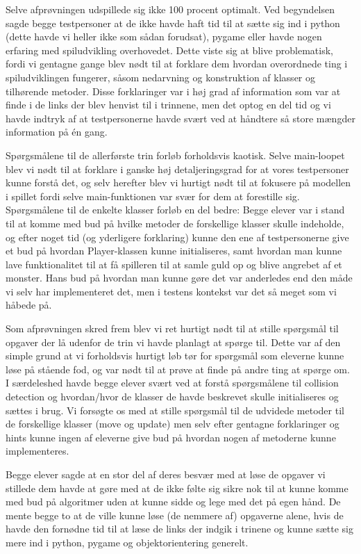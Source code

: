 \documentclass[10pt,a4paper,danish]{article}
\begin{document}
Selve afprøvningen udspillede sig ikke 100 procent optimalt. Ved begyndelsen sagde
begge testpersoner at de ikke havde haft tid til at sætte sig 
ind i python (dette havde vi heller ikke som sådan forudsat), pygame eller havde nogen 
erfaring med spiludvikling overhovedet. Dette viste sig at blive problematisk, fordi 
vi gentagne gange blev nødt til at forklare dem hvordan overordnede ting i spiludviklingen
fungerer, såsom nedarvning og konstruktion af klasser og tilhørende metoder. Disse forklaringer
var i høj grad af information som var at finde i de links der blev henvist til i trinnene, 
men det optog en del tid og vi havde indtryk af at testpersonerne havde svært ved at 
håndtere så store mængder information på én gang. 

Spørgsmålene til de allerførste trin forløb forholdsvis kaotisk. Selve main-loopet
blev vi nødt til at forklare i ganske høj detaljeringsgrad for at vores testpersoner
kunne forstå det, og selv herefter blev vi hurtigt nødt til at fokusere på modellen
i spillet fordi selve main-funktionen var svær for dem at forestille sig. Spørgsmålene
til de enkelte klasser forløb en del bedre: Begge elever var i stand til at komme med 
bud på hvilke metoder de forskellige klasser skulle indeholde, og efter noget tid (og
yderligere forklaring) kunne den ene af testpersonerne give et bud på hvordan Player-klassen
kunne initialiseres, samt hvordan man kunne lave funktionalitet til at få spilleren 
til at samle guld op og blive angrebet af et monster. Hans bud på hvordan man kunne gøre 
det var anderledes end den måde vi selv har implementeret det, men i testens kontekst
var det så meget som vi håbede på.

Som afprøvningen skred frem blev vi ret hurtigt nødt til at stille spørgsmål til 
opgaver der lå udenfor de trin vi havde planlagt at spørge til. Dette var af den 
simple grund at vi forholdsvis hurtigt løb tør for spørgsmål som eleverne kunne løse
på stående fod, og var nødt til at prøve at finde på andre ting at spørge om. I særdeleshed
havde begge elever svært ved at forstå spørgsmålene til collision detection og 
hvordan/hvor de klasser de havde beskrevet skulle initialiseres og sættes i brug. Vi 
forsøgte os med at stille spørgsmål til de udvidede metoder til de forskellige klasser
(move og update) men selv efter gentagne forklaringer og hints kunne
ingen af eleverne give bud på hvordan nogen af metoderne kunne implementeres. 

Begge elever sagde at en stor del af deres besvær med at løse de opgaver
vi stillede dem havde at gøre med at de ikke følte sig sikre nok til at kunne
komme med bud på algoritmer uden at kunne sidde og lege med det på egen hånd.
De mente begge to at de ville kunne løse (de nemmere af) opgaverne alene, hvis
de havde den fornødne tid til at læse de links der indgik i trinene og kunne
sætte sig mere ind i python, pygame og objektorientering generelt. 
\end{document}
